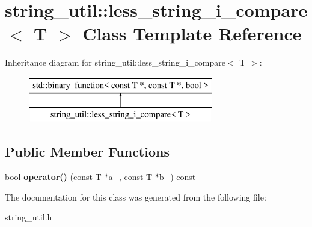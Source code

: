 \hypertarget{classstring__util_1_1less__string__i__compare}{\section{string\+\_\+util\+:\+:less\+\_\+string\+\_\+i\+\_\+compare$<$ T $>$ Class Template Reference}
\label{classstring__util_1_1less__string__i__compare}
}
Inheritance diagram for string\+\_\+util\+:\+:less\+\_\+string\+\_\+i\+\_\+compare$<$ T $>$\+:\begin{figure}[H]
\begin{center}
\leavevmode
\includegraphics[height=2.000000cm]{classstring__util_1_1less__string__i__compare}
\end{center}
\end{figure}
\subsection*{Public Member Functions}
\begin{DoxyCompactItemize}
\item 
\hypertarget{classstring__util_1_1less__string__i__compare_ae2dd6a625b07bc51060805b30e7547a1}{bool {\bfseries operator()} (const T $\ast$a\+\_\+, const T $\ast$b\+\_\+) const }\label{classstring__util_1_1less__string__i__compare_ae2dd6a625b07bc51060805b30e7547a1}

\end{DoxyCompactItemize}


The documentation for this class was generated from the following file\+:\begin{DoxyCompactItemize}
\item 
string\+\_\+util.\+h\end{DoxyCompactItemize}
